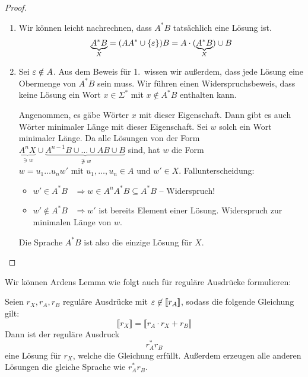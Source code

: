 \begin{proof}
\hfill \vspace{-\baselineskip} \\
\begin{enumerate}
 \item Wir können leicht nachrechnen, dass $A^*B$ tatsächlich eine Lösung ist.
 $$ \underbrace{A^*B}_X = (AA^*\cup \{\varepsilon\})B = A\cdot (\underbrace{A^*B}_X)\cup B$$
 \item Sei $\varepsilon \notin A$.
 Aus dem Beweis für 1.\ wissen wir außerdem, dass jede Lösung eine Obermenge von $A^*B$ sein muss.
 Wir führen einen Widerspruchsbeweis, dass keine Lösung ein Wort $x\in\Sigma^*$ mit $x\notin A^*B$ enthalten kann.
 
 Angenommen, es gäbe Wörter $x$ mit dieser Eigenschaft.
 Dann gibt es auch Wörter minimaler Länge mit dieser Eigenschaft.
 Sei $w$ solch ein Wort minimaler Länge.
 Da alle Lösungen von der Form $\underbrace{A^nX}_{\ni w} \cup \underbrace{A^{n-1}B \cup \dots \cup AB \cup B}_{\not\ni w}$ sind, hat $w$ die Form
 $w = u_1\dots u_n w'\text{ mit } u_1,\dots,u_n\in A\text{ und } w'\in X$.
 Fallunterscheidung:
 \begin{itemize}
  \item $w' \in A^*B$ \ $\Rightarrow w\in A^nA^*B\subseteq A^*B$ -- Widerspruch!
  \item $w' \notin A^*B$ \ $\Rightarrow w'$ ist bereits Element einer Lösung. Widerspruch zur minimalen Länge von $w$.
 \end{itemize}
 Die Sprache $A^*B$ ist also die einzige Lösung für $X$.
 \qedhere
\end{enumerate}
\end{proof}

Wir können Ardens Lemma wie folgt auch für reguläre Ausdrücke formulieren:
\begin{Korollar}
   Seien $r_X,r_A,r_B$ reguläre Ausdrücke mit $\varepsilon \not \in [\![ r_A ]\!]$, sodass die folgende Gleichung gilt:
  \begin{displaymath}
    \llbracket r_X \rrbracket = \llbracket r_A \cdot r_X + r_B \rrbracket
  \end{displaymath}
  Dann ist der reguläre Ausdruck
  \begin{displaymath}
    r_A^*r_B
  \end{displaymath}
  eine Lösung für $r_X$, welche die Gleichung erfüllt. Außerdem erzeugen alle anderen Lösungen die gleiche Sprache wie $r_A^*r_B$.
\end{Korollar}

